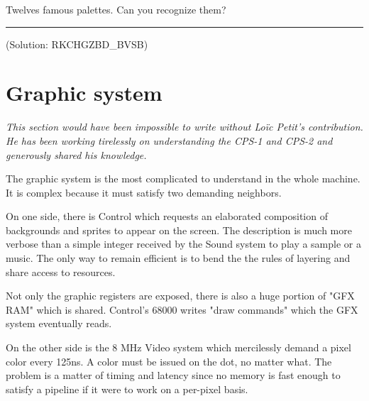 Twelves famous palettes. Can you recognize them?









\par\noindent\rule{\textwidth}{0.4pt}





 (Solution: RKCHGZBD\_BVSB)














\section{Graphic system}

\emph{This section would have been impossible to write without Lo\"{i}c Petit's contribution. He has been working tirelessly on understanding the CPS-1 and CPS-2 and generously shared his knowledge.}

The graphic system is the most complicated to understand in the whole machine. It is complex because it must satisfy two demanding neighbors.

On one side, there is Control which requests an elaborated composition of backgrounds and sprites to appear on the screen. The description is much more verbose than a simple integer received by the Sound system to play a sample or a music. The only way to remain efficient is to bend the the rules of layering and share access to resources. 

Not only the graphic registers are exposed, there is also a huge portion of "GFX RAM" which is shared. Control's 68000 writes "draw commands" which the GFX system eventually reads.

On the other side is the 8 MHz Video system which mercilessly demand a pixel color every 125ns. A color must be issued on the dot, no matter what. The problem is a matter of timing and latency since no memory is fast enough to satisfy a pipeline if it were to work on a per-pixel basis. 

